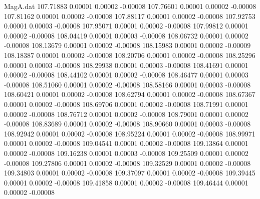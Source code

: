\begin{filecontents}{MagA.dat}
 107.71883    0.00001    0.00002   -0.00008
 107.76601    0.00001    0.00002   -0.00008
 107.81162    0.00001    0.00002   -0.00008
 107.88117    0.00001    0.00002   -0.00008
 107.92753    0.00001    0.00003   -0.00008
 107.95071    0.00001    0.00002   -0.00008
 107.99812    0.00001    0.00002   -0.00008
 108.04419    0.00001    0.00003   -0.00008
 108.06732    0.00001    0.00002   -0.00008
 108.13679    0.00001    0.00002   -0.00008
 108.15983    0.00001    0.00002   -0.00009
 108.18387    0.00001    0.00002   -0.00008
 108.20706    0.00001    0.00002   -0.00008
 108.25296    0.00001    0.00003   -0.00008
 108.29938    0.00001    0.00003   -0.00008
 108.41691    0.00001    0.00002   -0.00008
 108.44102    0.00001    0.00002   -0.00008
 108.46477    0.00001    0.00003   -0.00008
 108.51060    0.00001    0.00002   -0.00008
 108.58166    0.00001    0.00003   -0.00008
 108.60421    0.00001    0.00002   -0.00008
 108.62794    0.00001    0.00002   -0.00008
 108.67367    0.00001    0.00002   -0.00008
 108.69706    0.00001    0.00002   -0.00008
 108.71991    0.00001    0.00002   -0.00008
 108.76712    0.00001    0.00002   -0.00008
 108.79001    0.00001    0.00002   -0.00008
 108.83689    0.00001    0.00002   -0.00008
 108.90660    0.00001    0.00003   -0.00008
 108.92942    0.00001    0.00002   -0.00008
 108.95224    0.00001    0.00002   -0.00008
 108.99971    0.00001    0.00002   -0.00008
 109.04541    0.00001    0.00002   -0.00008
 109.13864    0.00001    0.00002   -0.00008
 109.16238    0.00001    0.00003   -0.00008
 109.25509    0.00001    0.00002   -0.00008
 109.27806    0.00001    0.00002   -0.00008
 109.32529    0.00001    0.00002   -0.00008
 109.34803    0.00001    0.00002   -0.00008
 109.37097    0.00001    0.00002   -0.00008
 109.39445    0.00001    0.00002   -0.00008
 109.41858    0.00001    0.00002   -0.00008
 109.46444    0.00001    0.00002   -0.00008
\end{filecontents}
